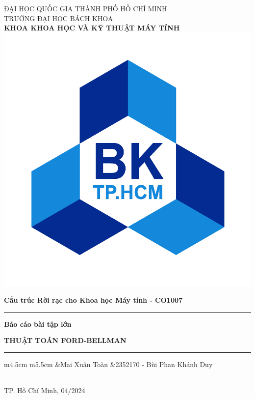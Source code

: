 \documentclass[11pt]{article}
\begin{document}
\thispagestyle{empty} %
\begin{center}
ĐẠI HỌC QUỐC GIA THÀNH PHỐ HỒ CHÍ MINH\\
TRƯỜNG ĐẠI HỌC BÁCH KHOA\\
\textbf{KHOA KHOA HỌC VÀ KỸ THUẬT MÁY TÍNH}\\
\vspace{2.5cm}
\includegraphics[scale=0.09375]{logo}
\vspace{1.5cm}
\end{center}
\textbf{\large Cấu trúc Rời rạc cho Khoa học Máy tính - CO1007}\\
\hrule height 1.25pt \relax
\vspace{0.5cm}
\noindent\textbf{Báo cáo bài tập lớn}
\begin{adjustwidth}{0.2cm}{0.2cm}
    \begin{center}
        \textbf{\LARGE THUẬT TOÁN FORD-BELLMAN}
    \end{center}
\end{adjustwidth}
\vspace{0.25cm}
\hrule height 1.25pt \relax
\vspace{0.5cm}
\begin{center}
    \begin{tabular}{m{4.5cm} m{5.5cm}}
        &Mai Xuân Toàn\cr
        &2352170 - Bùi Phan Khánh Duy\cr
    \end{tabular}\\
    \vspace{\fill}
    TP. Hồ Chí Minh, 04/2024
\end{center}
\newpage

\end{document}
